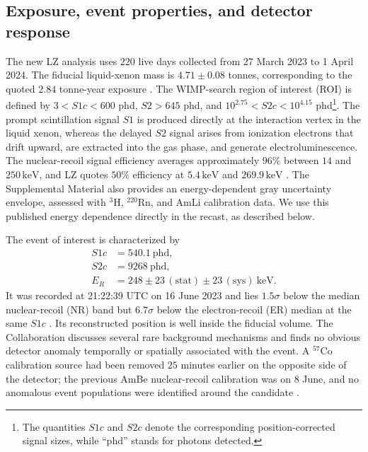 \documentclass[aps,prd,reprint,superscriptaddress,nofootinbib,longbibliography,floatfix]{revtex4-2}
\newcommand{\er}{E_{R}}
\newcommand{\keV}{\mathrm{keV}}
\begin{document}
\subsection{Exposure, event properties, and detector response}

The new LZ analysis uses $220$ live days collected from 27 March 2023 to 1 April 2024. The fiducial liquid-xenon mass is $4.71\pm0.08$ tonnes, corresponding to the quoted $2.84$ tonne-year exposure \cite{LZ2026Extended}. The WIMP-search region of interest (ROI) is defined by $3<S1c<600$ phd, $S2>645$ phd, and $10^{2.75}<S2c<10^{4.15}$ phd\footnote{The quantities $S1c$ and $S2c$ denote the corresponding position-corrected signal sizes, while ``phd'' stands for photons detected.}. The prompt scintillation signal $S1$ is produced directly at the interaction vertex in the liquid xenon, whereas the delayed $S2$ signal arises from ionization electrons that drift upward, are extracted into the gas phase, and generate electroluminescence. The nuclear-recoil signal efficiency averages approximately $96\%$ between $14$ and $250\,\keV$, and LZ quotes $50\%$ efficiency at $5.4\,\keV$ and $269.9\,\keV$ \cite{LZ2026Extended}. The Supplemental Material also provides an energy-dependent gray uncertainty envelope, assessed with $^3$H, $^{220}$Rn, and AmLi calibration data. We use this published energy dependence directly in the recast, as described below.

The event of interest is characterized by
\begin{align}
S1c &= 540.1\ \mathrm{phd},\\
S2c &= 9268\ \mathrm{phd},\\
\er &= 248\pm23\,(\mathrm{stat})\pm23\,(\mathrm{sys})\ \keV.
\end{align}
It was recorded at 21:22:39 UTC on 16 June 2023 and lies $1.5\sigma$ below the median nuclear-recoil (NR) band but $6.7\sigma$ below the electron-recoil (ER) median at the same $S1c$ \cite{LZ2026Extended}. Its reconstructed position is well inside the fiducial volume. The Collaboration discusses several rare background mechanisms and finds no obvious detector anomaly temporally or spatially associated with the event. A $^{57}\mathrm{Co}$ calibration source had been removed $25$ minutes earlier on the opposite side of the detector; the previous AmBe nuclear-recoil calibration was on 8 June, and no anomalous event populations were identified around the candidate \cite{LZ2026Extended}.
\end{document}
